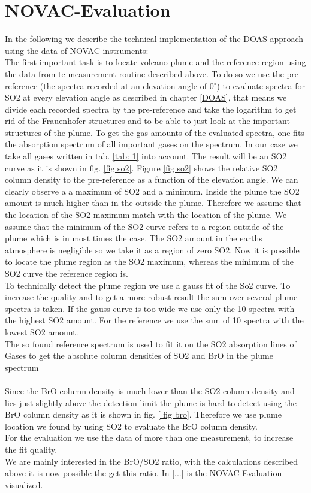\documentclass  [
  paper    = a4,
  BCOR     = 10mm,
  twoside,
  fontsize = 12pt,
  fleqn,
  toc      = bibnumbered,
  toc      = listofnumbered,
  numbers  = noendperiod,
  headings = normal,
  listof   = leveldown,
  version  = 3.03
]                                       {scrreprt}
\begin{document}
	\section{NOVAC-Evaluation}
	In the following we describe the technical implementation of the DOAS approach using the data of NOVAC instruments:\\
	The first important task is to locate volcano plume and the reference region using the data from te measurement routine described above.
	To do so we use the pre-reference (the spectra recorded at an elevation angle of  0$^{\circ} $) to evaluate spectra for SO2 at every elevation angle as described in chapter \ref{DOAS}, that means we divide each recorded spectra by the pre-reference and take the logarithm  to get rid of the Frauenhofer structures and to be able to just look at the important structures of the plume. To get the gas amounts of the evaluated spectra, one fits the absorption spectrum of all important gases on the spectrum. In our case we take all gases written in tab. \ref{tab: 1} into account. The result will be an SO2 curve as it is shown in fig. \ref{fig so2}.
	Figure \ref{fig so2} shows the relative SO2 column density to the pre-reference as a function of the elevation angle. We can clearly observe a a maximum of SO2 and a minimum. Inside the plume the SO2 amount is much higher than in the outside the plume. Therefore we assume that the location of the SO2 maximum match with the location of the plume. We assume that the minimum of the SO2 curve refers to a region outside of the plume which is in most times the case. The SO2 amount in the earths atmosphere is negligible so we take it as a region of zero SO2. Now it is possible to locate the plume region as the SO2 maximum, whereas the minimum of the SO2 curve the reference region is. \\
	To technically detect the plume region we use a gauss fit of the So2 curve.
	To increase the quality and to get a more robust result the sum over several plume spectra is taken. If the gauss curve is too wide we use only the 10 spectra with the highest SO2 amount. For the reference we use the sum of 10 spectra with the lowest SO2 amount.\\
	The so found reference spectrum is used to fit it on the SO2 absorption lines of Gases to get the absolute column densities of SO2 and BrO in the plume spectrum\\
	\\
	Since the BrO column density is much lower than the SO2 column density and lies just slightly above the detection limit the plume is hard to detect using the BrO column density as it is shown in fig. \ref{ fig bro}. 
	Therefore we use plume location we found by using SO2 to evaluate the BrO column density.\\
	For the evaluation we use the data of more than one measurement, to increase the fit quality.\\
	We are mainly interested in the BrO/SO2 ratio, with the calculations described above it is now possible the get this ratio.
	In \cref{...} is the NOVAC Evaluation visualized.
	
\end{document}
